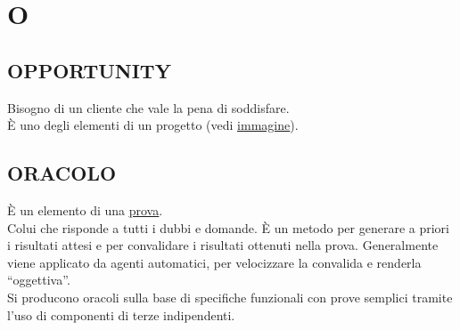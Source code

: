 \newpage
	\section{O} \label{sec:O}

		\subsection{OPPORTUNITY}  \label{opportunity}
		Bisogno di un cliente che vale la pena di soddisfare. \\
		È uno degli elementi di un progetto (vedi \underline{\hyperref[customerimage]{immagine}}).

		\subsection{ORACOLO}		\label{oracolo}	%
		È un elemento di una \underline{\hyperref[testsuite]{prova}}. \\
		Colui che risponde a tutti i dubbi e domande. È un metodo per generare a priori i risultati attesi e per convalidare i risultati ottenuti nella prova.
		Generalmente viene applicato da agenti automatici, per velocizzare la convalida e renderla ``oggettiva''. \\
		Si producono oracoli sulla base di specifiche funzionali con prove semplici tramite l'uso di componenti di terze indipendenti.
